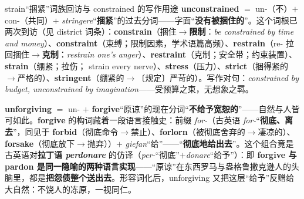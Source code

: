 \documentclass[../main.tex]{subfiles}
\begin{document}


\begin{gram}{strain“捆紧”词族回访与 constrained 的写作用途}
\textbf{unconstrained} $=$ un-（不）$+$ con-（共同）$+$ \textit{stringere}“\textbf{捆紧}”的过去分词——字面“\textbf{没有被捆住的}”。这个词根已两次到访（见 district 词条）：\textbf{constrain}（捆住$\to$\textbf{限制}：\textit{be constrained by time and money}）、\textbf{constraint}（束缚；限制因素，学术语篇高频）、\textbf{restrain}（re- 拉回捆住$\to$\textbf{克制}：\textit{restrain one's anger}）、\textbf{restraint}（克制；安全带；约束装置）、\textbf{strain}（绷紧；拉伤； strain every nerve）、\textbf{stress}（压力）、\textbf{strict}（捆得紧的$\to$严格的）、\textbf{stringent}（绷紧的$\to$〔规定〕严苛的）。写作对句：\textit{constrained by budget, unconstrained by imagination}——受预算之束，无想象之羁。
\end{gram}



\begin{origin}
\textbf{unforgiving} $=$ un- $+$ \textbf{forgive}“原谅”的现在分词“\textbf{不给予宽恕的}”——自然与人皆可如此。\textbf{forgive} 的构词藏着一段语言接触史：前缀 \textit{for-}（古英语 \textit{for-}“\textbf{彻底、离去}”，同见于 \textbf{forbid}（彻底命令$\to$禁止）、\textbf{forlorn}（被彻底舍弃的$\to$凄凉的）、\textbf{forsake}（彻底放下$\to$抛弃））$+$ \textit{giefan}“给”——“\textbf{彻底地给出去}”。这个组合竟是古英语对\textbf{拉丁语 \textit{perdonare}} 的仿译（\textit{per-}“彻底”$+$\textit{donare}“给予”）：即 \textbf{forgive 与 pardon 是同一隐喻的两种语言实现}——“原谅”在东西罗马与盎格鲁撒克逊人的头脑里，都是\textbf{把怨债整个送出去}。形容词化后，unforgiving 又把这层“给予”反赠给大自然：不饶人的冻原，一视同仁。
\end{origin}
\end{document}
